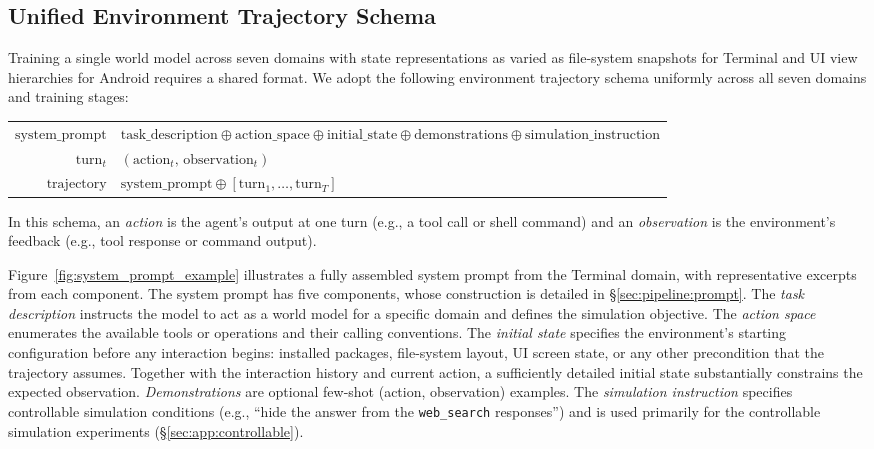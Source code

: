 \subsection{Unified Environment Trajectory Schema}
\label{sec:prelim:schema}

Training a single world model across seven domains with state representations as varied as file-system snapshots for Terminal and UI view hierarchies for Android requires a shared format.
We adopt the following environment trajectory schema uniformly across all seven domains and training stages:

\begin{tcolorbox}[
  colback=gray!3, colframe=black!50,
  boxrule=0.5pt, arc=2pt,
  title={\small\bfseries Unified Environment Trajectory Schema},
  top=4pt, bottom=4pt, left=6pt, right=6pt
]
\small
\begin{tabular}{@{}r@{$\;\,:=\;\,$}l@{}}
$\mathrm{system\_prompt}$ & $\mathrm{task\_description} \oplus \mathrm{action\_space} \oplus \mathrm{initial\_state} \oplus \mathrm{demonstrations} \oplus \mathrm{simulation\_instruction}$ \\[4pt]
$\mathrm{turn}_t$ & $(\mathrm{action}_t,\,\mathrm{observation}_t)$ \\[4pt]
$\mathrm{trajectory}$ & $\mathrm{system\_prompt} \oplus [\mathrm{turn}_1, \ldots, \mathrm{turn}_T]$
\end{tabular}
\end{tcolorbox}

In this schema, an \emph{action} is the agent's output at one turn (e.g., a tool call or shell command) and an \emph{observation} is the environment's feedback (e.g., tool response or command output).

Figure~\ref{fig:system_prompt_example} illustrates a fully assembled system prompt from the Terminal domain, with representative excerpts from each component.
The system prompt has five components, whose construction is detailed in \S\ref{sec:pipeline:prompt}.
The \emph{task description} instructs the model to act as a world model for a specific domain and defines the simulation objective.
The \emph{action space} enumerates the available tools or operations and their calling conventions.
The \emph{initial state} specifies the environment's starting configuration before any interaction begins: installed packages, file-system layout, UI screen state, or any other precondition that the trajectory assumes.
Together with the interaction history and current action, a sufficiently detailed initial state substantially constrains the expected observation.
\emph{Demonstrations} are optional few-shot (action, observation) examples.
The \emph{simulation instruction} specifies controllable simulation conditions (e.g., ``hide the answer from the \texttt{web\_search} responses'') and is used primarily for the controllable simulation experiments (\S\ref{sec:app:controllable}).



